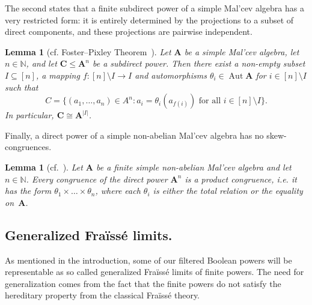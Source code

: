 \documentclass[12pt,a4paper,reqno]{amsart}
\numberwithin{equation}{section}
\theoremstyle{plain}
\newtheorem{lem}[thm]{Lemma}
\theoremstyle{definition}
\newcommand{\A}{\mathbf{A}}
\newcommand{\C}{\mathbf{C}}
\newcommand{\D}{\mathbf{D}}
\newcommand{\N}{\mathbb{N}}
\DeclareMathOperator{\Aut}{Aut}
\begin{document}

The second states that a finite subdirect power of a simple Mal'cev algebra has a very restricted form:
it is entirely determined by the projections to a subset of direct components, and these projections are pairwise independent.

\begin{lem}[cf. Foster--Pixley Theorem~{}]
\label{la:FP}
Let $\A$ be a simple Mal'cev algebra, let $n\in\N$, and let $\C\leq \A^n$ be a subdirect power.
Then there exist a non-empty subset $I\subseteq [n]$, a mapping $f\colon {[n]\setminus I}\rightarrow I$ and automorphisms $\theta_i\in\Aut\A$ for $i\in [n]\setminus I$ such that
\[
C=\{ (a_1,\dots,a_n)\in A^n\colon a_i=\theta_i(a_{f(i)})\text{ for all }i\in [n]\setminus I\}.
\]
In particular, $\C\cong \A^{|I|}$.
\end{lem}




Finally, a direct power of a simple non-abelian Mal'cev algebra has no skew-congruences.

\begin{lem}[cf.~{\protect\cite[Lemma 9.69, Corollary 9.66]{FMMT:ALV3}}]
\label{la:noskew}
Let $\A$ be a finite simple non-abelian Mal'cev algebra and let $n\in\N$.
Every congruence of the direct power $\A^n$ is a product congruence,
i.e. it has the form $\theta_1\times\dots\times \theta_n$, where each $\theta_i$ is either the total relation or the equality on~$\A$.
\end{lem}

 

\subsection{Generalized Fra{\"i}ss{\'e} limits.}
\label{subsec:GenFre}

As mentioned in the introduction, some of our filtered Boolean powers will be representable as so called generalized Fra{\"i}ss{\'e} limits of finite powers.
The need for generalization comes from the fact that the finite powers do not satisfy the hereditary property from the classical Fra{\"i}ss{\'e} theory.
\end{document}
